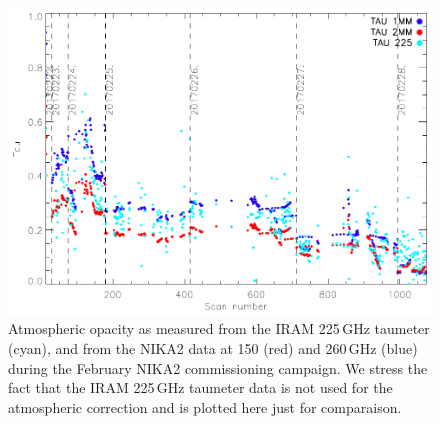 \documentclass[]{aa} %
\begin{document}
\begin{figure}
\includegraphics[scale=0.55]{./opacity_evol_run22.pdf}
\caption{Atmospheric opacity as measured from the IRAM 225\,GHz taumeter (cyan), and from the NIKA2 data at 150 (red) and 260\,GHz (blue) during the February NIKA2 commissioning campaign. We stress the fact that the IRAM 225\,GHz taumeter data is not used for the atmospheric correction and is plotted here just for comparaison.
  \label{fig:taumeas}}
\end{figure}
\end{document}
